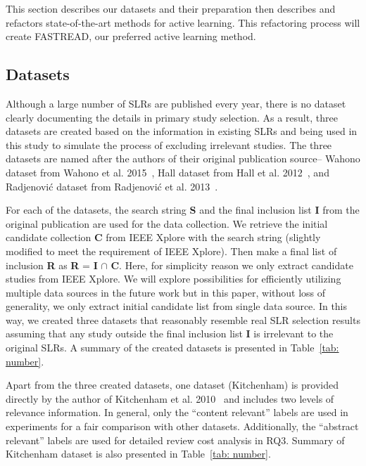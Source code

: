\documentclass{svjour3}
\theoremstyle{break}
\begin{document}
This section describes our datasets and their preparation then describes and refactors state-of-the-art methods for active learning.
This refactoring process will create FASTREAD, our preferred active learning
method. 

\subsection{Datasets}
\label{sect: datasets}

Although a large number of SLRs are published every year, there is no dataset clearly documenting the details in primary study selection. As a result, three datasets are created based on the information in existing SLRs and being used in this study to simulate the process of excluding irrelevant studies. The three datasets are named after the authors of their original publication source-- Wahono dataset from Wahono et al. 2015~\cite{wahono2015systematic}, Hall dataset from Hall et al. 2012~\cite{hall2012systematic}, and Radjenovi{\'c} dataset from Radjenovi{\'c} et al. 2013~\cite{radjenovic2013software}. 

For each of the datasets, the search string \textbf{S} and the final inclusion list \textbf{I} from the original publication are used for the data collection. We retrieve the initial candidate collection \textbf{C} from IEEE Xplore with the search string (slightly modified to meet the requirement of IEEE Xplore). Then make a final list of inclusion \textbf{R} as \textbf{R} = \textbf{I} $\cap$ \textbf{C}. Here, for simplicity reason we only extract candidate studies from IEEE Xplore. We will explore possibilities for efficiently utilizing multiple data sources in the future work but in this paper, without loss of generality, we only extract initial candidate list from single data source. In this way, we created three datasets that reasonably resemble real SLR selection results assuming that any study outside the final inclusion list \textbf{I} is irrelevant to the original SLRs. A summary of the created datasets is presented in Table~\ref{tab: number}.

Apart from the three created datasets, one dataset (Kitchenham) is provided directly by the author of Kitchenham et al. 2010~\cite{kitchenham2010systematic} and includes two levels of relevance information. In general, only the ``content relevant'' labels are used in experiments for a fair comparison with other datasets. Additionally, the ``abstract relevant'' labels are used for detailed review cost analysis in RQ3. Summary of Kitchenham dataset is also presented in Table~\ref{tab: number}.
\end{document}
